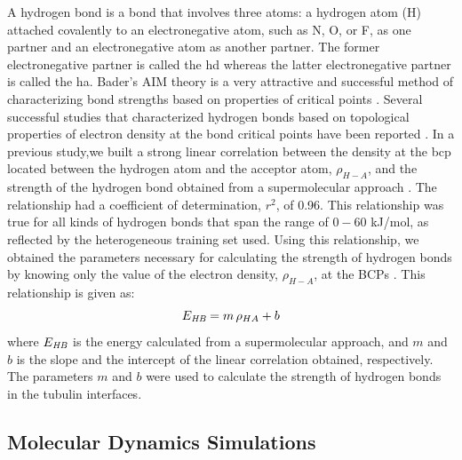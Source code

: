 \documentclass[11pt]{report}
\begin{document}
A hydrogen bond is a bond that involves three atoms: a hydrogen atom (H) attached covalently to an electronegative atom, such as N, O, or F, as one partner and an electronegative atom as another partner. The former electronegative partner is called the \gls{hd} whereas the latter electronegative partner is called the \gls{ha}. Bader's AIM theory is a very attractive and successful method of characterizing bond strengths based on properties of critical points
\cite{Bader1990,Bader1991}. 
Several successful studies that characterized hydrogen bonds based on topological properties of electron density at the bond critical points have been reported \cite{Popelier1998,Grabowski2001,Scheiner2001,Parthasarathi2006}. In a previous study,we built a strong linear correlation between the density at the \gls{bcp} located between the hydrogen atom and the acceptor atom, $\rho_{H-A}$, and the strength of the hydrogen bond obtained from a supermolecular approach
\cite{Ayoub2014HB}. 
The relationship had a coefficient of determination, $r^2$, of 0.96. This relationship was true for all kinds of
hydrogen bonds that span the range of $0-60$ kJ/mol, as reflected by the heterogeneous training set used. Using this relationship, we obtained the parameters necessary for calculating the strength of hydrogen bonds by knowing only the value of the electron density, $\rho_{H-A}$, at the BCPs
\cite{Ayoub2014HB}. 
This relationship is given as:
\begin{equation}
\label{eq:THP-fit}
E_{\emph{HB}} = m\, \rho_{HA} + b
\end{equation}
where $E_{\emph{HB}}$ is the energy calculated from a supermolecular approach, and $m$ and $b$ is the slope and the intercept of the linear correlation obtained, respectively. The parameters $m$ and $b$ were used to calculate the strength of hydrogen bonds in the tubulin interfaces.

\subsection{Molecular Dynamics Simulations}
\label{ss:THB-Methods_MDSim}
\end{document}
